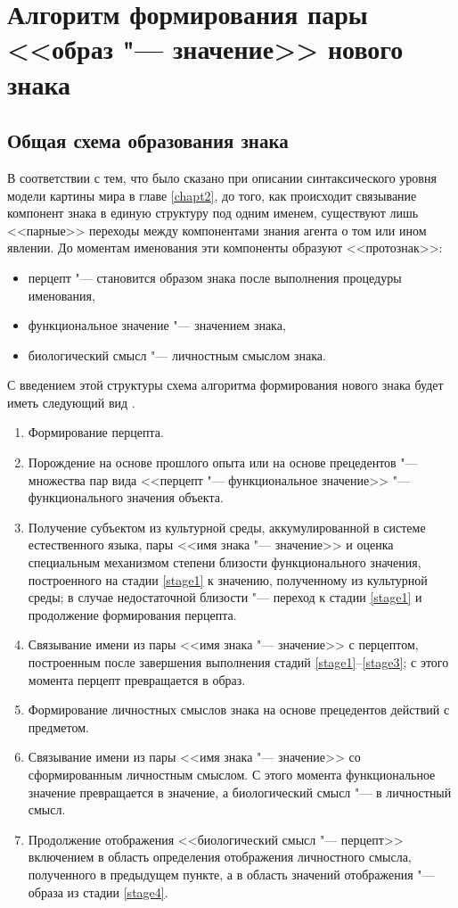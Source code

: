 \section{Алгоритм формирования пары <<образ "--- значение>> нового знака} \label{sect3_3}

\subsection{Общая схема образования знака}

В соответствии с тем, что было сказано при описании синтаксического уровня модели картины мира в главе \ref{chapt2}, до того, как происходит связывание компонент знака в единую структуру под одним именем, существуют лишь <<парные>> переходы между компонентами знания агента о том или ином явлении. До моментам именования эти компоненты образуют <<протознак>>:
\begin{itemize}
	\item перцепт "--- становится образом знака после выполнения процедуры именования,
	\item функциональное значение "--- значением знака,
	\item биологический смысл "--- личностным смыслом знака.
	\end{itemize}
	
С введением этой структуры схема алгоритма формирования нового знака будет иметь следующий вид \cite{PanovA2014a}.

\begin{enumerate}
	\label{new_sign_alg}
	\renewcommand\labelenumi{\theenumi .}
	\item\label{stage1} Формирование перцепта.
	\item\label{stage2} Порождение на основе прошлого опыта или на основе прецедентов "--- множества пар вида <<перцепт "--- функциональное значение>> "--- функционального значения объекта.
	\item\label{stage3} Получение субъектом из культурной среды, аккумулированной в системе естественного языка, пары <<имя знака "--- значение>> и оценка специальным механизмом степени близости функционального значения, построенного на стадии \ref{stage1} к значению, полученному из культурной среды; в случае недостаточной близости "--- переход к стадии \ref{stage1} и продолжение формирования перцепта.
	\item\label{stage4} Связывание имени из пары <<имя знака "--- значение>> с перцептом, построенным после завершения выполнения стадий \ref{stage1}--\ref{stage3}; с этого момента перцепт превращается в образ.
	\item Формирование личностных смыслов знака на основе прецедентов действий с предметом.
	\item Связывание имени из пары <<имя знака "--- значение>> со сформированным личностным смыслом. С этого момента функциональное значение превращается в значение, а биологический смысл "--- в личностный смысл.
	\item Продолжение отображения <<биологический смысл "--- перцепт>> включением в область определения отображения личностного смысла, полученного в предыдущем пункте, а в область значений отображения "--- образа из стадии \ref{stage4}.
\end{enumerate}

